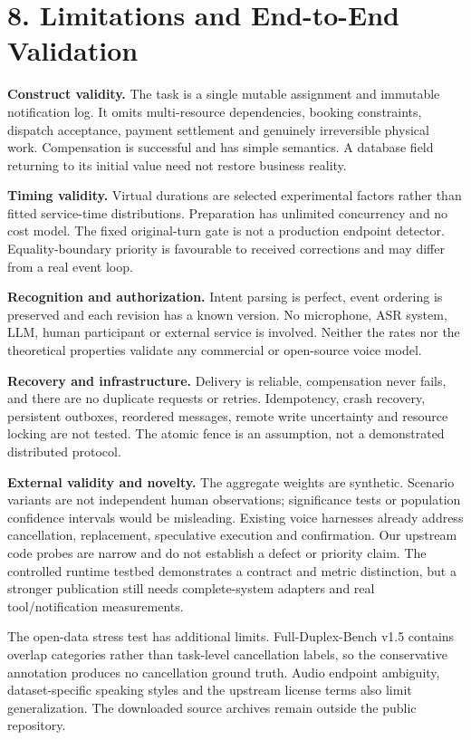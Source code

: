 \documentclass[10pt]{article}
\begin{document}
\section*{8. Limitations and End-to-End Validation}

\textbf{Construct validity.} The task is a single mutable assignment and immutable notification log. It omits multi-resource dependencies, booking constraints, dispatch acceptance, payment settlement and genuinely irreversible physical work. Compensation is successful and has simple semantics. A database field returning to its initial value need not restore business reality.


\textbf{Timing validity.} Virtual durations are selected experimental factors rather than fitted service-time distributions. Preparation has unlimited concurrency and no cost model. The fixed original-turn gate is not a production endpoint detector. Equality-boundary priority is favourable to received corrections and may differ from a real event loop.


\textbf{Recognition and authorization.} Intent parsing is perfect, event ordering is preserved and each revision has a known version. No microphone, ASR system, LLM, human participant or external service is involved. Neither the rates nor the theoretical properties validate any commercial or open-source voice model.


\textbf{Recovery and infrastructure.} Delivery is reliable, compensation never fails, and there are no duplicate requests or retries. Idempotency, crash recovery, persistent outboxes, reordered messages, remote write uncertainty and resource locking are not tested. The atomic fence is an assumption, not a demonstrated distributed protocol.


\textbf{External validity and novelty.} The aggregate weights are synthetic. Scenario variants are not independent human observations; significance tests or population confidence intervals would be misleading. Existing voice harnesses already address cancellation, replacement, speculative execution and confirmation. Our upstream code probes are narrow and do not establish a defect or priority claim. The controlled runtime testbed demonstrates a contract and metric distinction, but a stronger publication still needs complete-system adapters and real tool/notification measurements.


The open-data stress test has additional limits. Full-Duplex-Bench v1.5 contains overlap categories rather than task-level cancellation labels, so the conservative annotation produces no cancellation ground truth. Audio endpoint ambiguity, dataset-specific speaking styles and the upstream license terms also limit generalization. The downloaded source archives remain outside the public repository.
\end{document}
